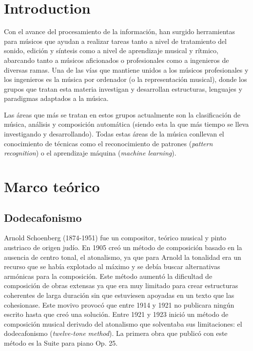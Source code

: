 \documentclass[a4paper,openright,12pt]{book}
\begin{document}
\cleardoublepage
{} %
\listoftables %




\chapter{Introduction}
Con el avance del procesamiento de la información, han surgido herramientas para músicos que ayudan a realizar tareas tanto a nivel de tratamiento del sonido, edición y síntesis como a nivel de aprendizaje musical y rítmico, abarcando tanto a músicos aficionados o profesionales como a ingenieros de diversas ramas. Una de las vías que mantiene unidos a los músicos profesionales y los ingenieros es la música por ordenador (o la representación musical), donde los grupos que tratan esta materia investigan y desarrollan estructuras, lenguajes y paradigmas adaptados a la música.

Las áreas que más se tratan en estos grupos actualmente son la clasificación de música, análisis y composición automática (siendo esta la que más tiempo se lleva investigando y desarrollando). Todas estas áreas de la música conllevan el conocimiento de técnicas como el reconocimiento de patrones (\emph{pattern recognition}) o el aprendizaje máquina (\emph{machine learning}).

\chapter{Marco teórico}\label{marcoteorico}
\section{Dodecafonismo}

Arnold Schoenberg (1874-1951) fue un compositor, teórico musical y pinto austriaco de origen judío. En 1905 creó un método de composición basado en la ausencia de centro tonal, el atonalismo, ya que para Arnold la tonalidad era un recurso que se había explotado al máximo y se debía buscar alternativas armónicas para la composición. Este método aumentó la dificultad de composición de obras extensas ya que era muy limitado para crear estructuras coherentes de larga duración sin que estuviesen apoyadas en un texto que las cohesionase. Este movivo provocó que entre 1914 y 1921 no publicara ningún escrito hasta que creó una solución. Entre 1921 y 1923 inició un método de composición musical derivado del atonalismo que solventaba sus limitaciones: el dodecafonismo (\emph{twelve-tone method})\cite{styleandidea}. La primera obra que publicó con este método es la Suite para piano Op. 25.
\end{document}
